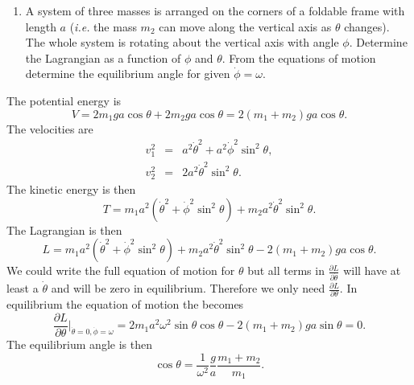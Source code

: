 \documentclass[letterpaper,11pt]{article}
\begin{document}
\begin{enumerate}[resume]
 \item A system of three masses is arranged on the corners of a foldable frame with length $a$ (\textit{i.e.} the mass $m_2$ can move along the vertical axis as $\theta$ changes).  The whole system is rotating about the vertical axis with angle $\phi$.  Determine the Lagrangian as a function of $\phi$ and $\theta$.  From the equations of motion determine the equilibrium angle for given $\dot\phi = \omega$.
 \begin{center}
 \end{center}
\end{enumerate}
The potential energy is
\begin{equation*}
 V = 2 m_1 g a \cos\theta + 2 m_2 g a \cos\theta = 2 (m_1 + m_2) g a \cos\theta.
\end{equation*}
The velocities are
\begin{eqnarray*}
 v_1^2 & = & a^2\dot\theta^2 + a^2\dot\phi^2\sin^2\theta, \\
 v_2^2 & = & 2 a^2 \dot\theta^2 \sin^2\theta.
\end{eqnarray*}
The kinetic energy is then
\begin{equation*}
 T = m_1 a^2 (\dot\theta^2 + \dot\phi^2 \sin^2\theta) + m_2 a^2 \dot\theta^2 \sin^2\theta.
\end{equation*}
The Lagrangian is then
\begin{equation*}
 L = m_1 a^2 (\dot\theta^2 + \dot\phi^2 \sin^2\theta) + m_2 a^2 \dot\theta^2 \sin^2\theta - 2 (m_1 + m_2) g a \cos\theta.
\end{equation*}
We could write the full equation of motion for $\theta$ but all terms in $\frac{\partial L}{\partial \dot\theta}$ will have at least a $\dot\theta$ and will be zero in equilibrium.  Therefore we only need $\frac{\partial L}{\partial \theta}$.  In equilibrium the equation of motion the becomes
\begin{equation*}
 \frac{\partial L}{\partial \theta}\Big|_{\dot\theta = 0, \dot\phi = \omega} = 2 m_1 a^2 \omega^2 \sin\theta\cos\theta - 2 (m_1 + m_2) g a \sin\theta = 0.
\end{equation*}
The equilibrium angle is then
\begin{equation*}
 \cos\theta = \frac{1}{\omega^2} \frac{g}{a} \frac{m_1+m_2}{m_1}.
\end{equation*}
\end{document}
